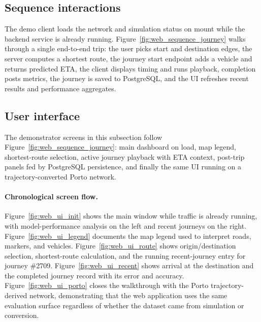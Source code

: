 \subsection{Sequence interactions}\label{sec:system:web:sequence}
The demo client loads the network and simulation status on mount while the backend service is already running. Figure~\ref{fig:web_sequence_journey} walks through a single end-to-end trip: the user picks start and destination edges, the server computes a shortest route, the journey start endpoint adds a vehicle and returns predicted ETA, the client displays timing and runs playback, completion posts metrics, the journey is saved to PostgreSQL, and the UI refreshes recent results and performance aggregates.



\subsection{User interface}\label{sec:system:web:ui}
The demonstrator screens in this subsection follow Figure~\ref{fig:web_sequence_journey}: main dashboard on load, map legend, shortest-route selection, active journey playback with ETA context, post-trip panels fed by PostgreSQL persistence, and finally the same UI running on a trajectory-converted Porto network.

\paragraph{Chronological screen flow.}
Figure~\ref{fig:web_ui_init} shows the main window while traffic is already running, with model-performance analysis on the left and recent journeys on the right. Figure~\ref{fig:web_ui_legend} documents the map legend used to interpret roads, markers, and vehicles. Figure~\ref{fig:web_ui_route} shows origin/destination selection, shortest-route calculation, and the running recent-journey entry for journey \#2709. Figure~\ref{fig:web_ui_recent} shows arrival at the destination and the completed journey record with its error and accuracy. Figure~\ref{fig:web_ui_porto} closes the walkthrough with the Porto trajectory-derived network, demonstrating that the web application uses the same evaluation surface regardless of whether the dataset came from simulation or conversion.



\FloatBarrier
